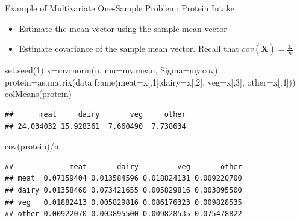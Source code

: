 \documentclass[
  ignorenonframetext,
]{beamer}
\newenvironment{Shaded}{\begin{snugshade}}{\end{snugshade}}
\newcommand{\AttributeTok}[1]{\textcolor[rgb]{0.77,0.63,0.00}{#1}}
\newcommand{\DecValTok}[1]{\textcolor[rgb]{0.00,0.00,0.81}{#1}}
\newcommand{\FunctionTok}[1]{\textcolor[rgb]{0.00,0.00,0.00}{#1}}
\newcommand{\NormalTok}[1]{#1}
\newcommand{\OtherTok}[1]{\textcolor[rgb]{0.56,0.35,0.01}{#1}}
\newcommand{\SpecialCharTok}[1]{\textcolor[rgb]{0.00,0.00,0.00}{#1}}
\providecommand{\tightlist}{%
  \setlength{\itemsep}{0pt}\setlength{\parskip}{0pt}}
\begin{document}
\begin{frame}[fragile]{Example of Multivariate One-Sample Problem:
Protein Intake}
\protect\hypertarget{example-of-multivariate-one-sample-problem-protein-intake-1}{}
\begin{itemize}
\tightlist
\item
  Estimate the mean vector using the sample mean vector
\item
  Estimate covariance of the sample mean vector. Recall that
  \(cov(\bar{\mathbf X})=\frac{\boldsymbol \Sigma}{n}\)
\end{itemize}

\tiny

\begin{Shaded}
\begin{Highlighting}[]
\FunctionTok{set.seed}\NormalTok{(}\DecValTok{1}\NormalTok{)}
\NormalTok{x}\OtherTok{=}\FunctionTok{mvrnorm}\NormalTok{(n, }\AttributeTok{mu=}\NormalTok{my.mean, }\AttributeTok{Sigma=}\NormalTok{my.cov)}
\NormalTok{protein}\OtherTok{=}\FunctionTok{as.matrix}\NormalTok{(}\FunctionTok{data.frame}\NormalTok{(}\AttributeTok{meat=}\NormalTok{x[,}\DecValTok{1}\NormalTok{],}\AttributeTok{dairy=}\NormalTok{x[,}\DecValTok{2}\NormalTok{], }
                             \AttributeTok{veg=}\NormalTok{x[,}\DecValTok{3}\NormalTok{], }\AttributeTok{other=}\NormalTok{x[,}\DecValTok{4}\NormalTok{]))}
\FunctionTok{colMeans}\NormalTok{(protein)}
\end{Highlighting}
\end{Shaded}

\begin{verbatim}
##      meat     dairy       veg     other 
## 24.034032 15.928361  7.660490  7.738634
\end{verbatim}

\begin{Shaded}
\begin{Highlighting}[]
\FunctionTok{cov}\NormalTok{(protein)}\SpecialCharTok{/}\NormalTok{n}
\end{Highlighting}
\end{Shaded}

\begin{verbatim}
##             meat       dairy         veg       other
## meat  0.07159404 0.013584596 0.018824131 0.009220700
## dairy 0.01358460 0.073421655 0.005829816 0.003895500
## veg   0.01882413 0.005829816 0.086176323 0.009828535
## other 0.00922070 0.003895500 0.009828535 0.075478822
\end{verbatim}

\normalsize
\end{frame}
\end{document}
